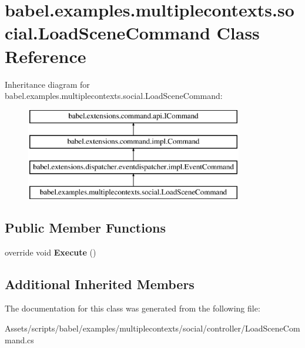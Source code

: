 \hypertarget{classbabel_1_1examples_1_1multiplecontexts_1_1social_1_1_load_scene_command}{\section{babel.\-examples.\-multiplecontexts.\-social.\-Load\-Scene\-Command Class Reference}
\label{classbabel_1_1examples_1_1multiplecontexts_1_1social_1_1_load_scene_command}
}
Inheritance diagram for babel.\-examples.\-multiplecontexts.\-social.\-Load\-Scene\-Command\-:\begin{figure}[H]
\begin{center}
\leavevmode
\includegraphics[height=4.000000cm]{classbabel_1_1examples_1_1multiplecontexts_1_1social_1_1_load_scene_command}
\end{center}
\end{figure}
\subsection*{Public Member Functions}
\begin{DoxyCompactItemize}
\item 
\hypertarget{classbabel_1_1examples_1_1multiplecontexts_1_1social_1_1_load_scene_command_abb566226080871eec7f51dacc2d06244}{override void {\bfseries Execute} ()}\label{classbabel_1_1examples_1_1multiplecontexts_1_1social_1_1_load_scene_command_abb566226080871eec7f51dacc2d06244}

\end{DoxyCompactItemize}
\subsection*{Additional Inherited Members}


The documentation for this class was generated from the following file\-:\begin{DoxyCompactItemize}
\item 
Assets/scripts/babel/examples/multiplecontexts/social/controller/Load\-Scene\-Command.\-cs\end{DoxyCompactItemize}
